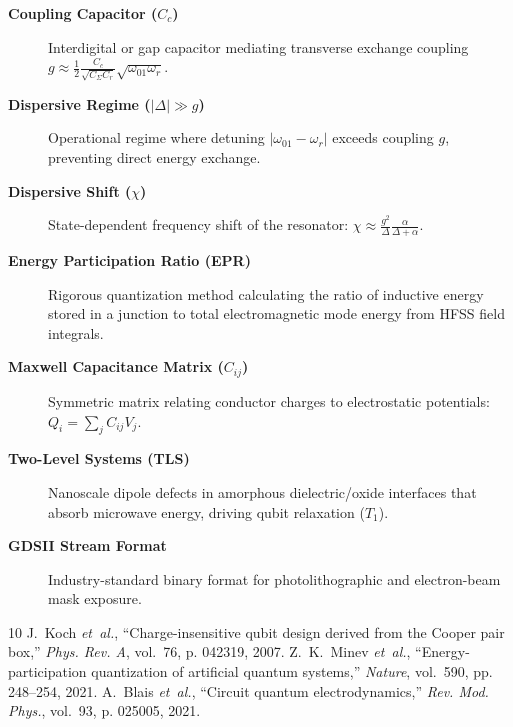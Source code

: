 \documentclass[10pt,journal,compsoc]{IEEEtran}
\begin{document}
\begin{description}
    \item[\textbf{Coupling Capacitor ($C_c$)}] Interdigital or gap capacitor mediating transverse exchange coupling $g \approx \frac{1}{2}\frac{C_c}{\sqrt{C_\Sigma C_r}}\sqrt{\omega_{01}\omega_r}$.
    \item[\textbf{Dispersive Regime ($|\Delta| \gg g$)}] Operational regime where detuning $|\omega_{01} - \omega_r|$ exceeds coupling $g$, preventing direct energy exchange.
    \item[\textbf{Dispersive Shift ($\chi$)}] State-dependent frequency shift of the resonator: $\chi \approx \frac{g^2}{\Delta} \frac{\alpha}{\Delta + \alpha}$.
    \item[\textbf{Energy Participation Ratio (EPR)}] Rigorous quantization method calculating the ratio of inductive energy stored in a junction to total electromagnetic mode energy from HFSS field integrals.
    \item[\textbf{Maxwell Capacitance Matrix ($C_{ij}$)}] Symmetric matrix relating conductor charges to electrostatic potentials: $Q_i = \sum_j C_{ij} V_j$.
    \item[\textbf{Two-Level Systems (TLS)}] Nanoscale dipole defects in amorphous dielectric/oxide interfaces that absorb microwave energy, driving qubit relaxation ($T_1$).
    \item[\textbf{GDSII Stream Format}] Industry-standard binary format for photolithographic and electron-beam mask exposure.
\end{description}

\begin{thebibliography}{10}
J.~Koch \emph{et~al.}, ``Charge-insensitive qubit design derived from the Cooper pair box,'' \emph{Phys. Rev. A}, vol.~76, p. 042319, 2007.
Z.~K.~Minev \emph{et~al.}, ``Energy-participation quantization of artificial quantum systems,'' \emph{Nature}, vol.~590, pp. 248--254, 2021.
A.~Blais \emph{et~al.}, ``Circuit quantum electrodynamics,'' \emph{Rev. Mod. Phys.}, vol.~93, p. 025005, 2021.
\end{thebibliography}
\end{document}
